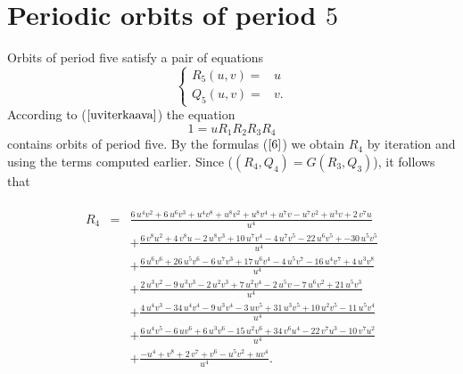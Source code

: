 \documentclass[12pt,a4paper]{amsart}
\numberwithin{equation}{section}
\numberwithin{lause}{section}
\begin{document}
\section{Periodic orbits of period $5$}

Orbits of period five satisfy a pair of equations
\begin{equation}
\left\{\begin{array}{ll}
      R_{5}(u,v)=&u\\
      Q_{5}(u,v)=&v.\label{101}
\end{array}\right.
\end{equation}
According to ($\ref{uviterkaava}$) the equation
\begin{equation}
1=uR_{1}R_{2}R_{3}R_{4} \label{104}
\end{equation}
contains orbits of period five.
By the formulas ($\ref{6}$) we obtain $R_{4}$ by iteration and using the terms computed earlier. Since ($(R_{4},Q_{4})=G(R_{3},Q_{3})$), it follows that  \\ \\
\begin{eqnarray}
R_{4}&=&\frac {6\,{u}^{4}{v}^{2}+6\,{u}^{6}{v}^{3}+{u}^{4}{v}^{8}+{u}^{8}{v}^{2}+{u}^{8}{v}^{4}+{u}^{7}v-{u}^{7}{v}^{2}+{u}^{3}v+2\,{v}^{7}u}{{u}^{4}}  \nonumber \\
     && +\frac {6\,{v}^{8}{u}^{2}+4\,{v}^{8}u-2\,{u}^{8}{v}^{3}+10\,{u}^{7}{v}^{4}-4\,{u}^{7}{v}^{5}-22\,{u}^{6}{v}^{5}+-30\,{u}^{5}{v}^{5}}{{u}^{4}} \nonumber \\
     &&+\frac {6\,{u}^{6}{v}^{6}+26\,{u}^{5}{v}^{6}-6\,{u}^{7}{v}^{3}+17\,{u}^{6}{v}^{4}-4\,{u}^{5}{v}^{7}-16\,{u}^{4}{v}^{7}+4\,{u}^{3}{v}^{8}}{{u}^{4}} \label{515} \\
     &&+\frac {2\,{u}^{3}{v}^{2}-9\,{u}^{3}{v}^{3}-2\,{u}^{2}{v}^{3}+7\,{u}^{2}{v}^{4}-2\,{u}^{5}v-7\,{u}^{6}{v}^{2}+21\,{u}^{5}{v}^{3}}{{u}^{4}} \nonumber \\
     &&+\frac {4\,{u}^{4}{v}^{3}-34\,{u}^{4}{v}^{4}-9\,{u}^{3}{v}^{4}-3\,u{v}^{5}+31\,{u}^{3}{v}^{5}+10\,{u}^{2}{v}^{5}-11\,{u}^{5}{v}^{4}}{{u}^{4}} \nonumber \\
     &&+\frac {6\,{u}^{4}{v}^{5}-6\,u{v}^{6}+6\,{u}^{3}{v}^{6}-15\,{u}^{2}{v}^{6}+34\,{v}^{6}{u}^{4}-22\,{v}^{7}{u}^{3}-10\,{v}^{7}{u}^{2}}{{u}^{4}} \nonumber \\
     &&+\frac {-{u}^{4}+{v}^{8}+2\,{v}^{7}+{v}^{6}-{u}^{5}{v}^{2}+u{v}^{4}}{{u}^{4}}. \nonumber
\end{eqnarray}
\end{document}
